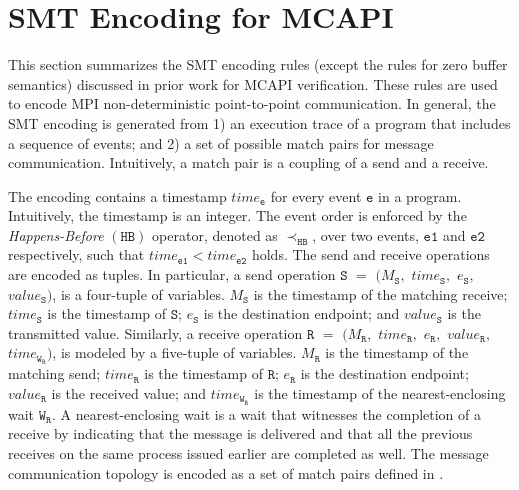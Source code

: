 \section{SMT Encoding for MCAPI}
This section summarizes the SMT encoding rules (except the rules for zero buffer semantics) discussed in prior work for MCAPI verification. These rules are used to encode MPI non-deterministic point-to-point communication. In general, the SMT encoding is generated from 1) an execution trace of a program that includes a sequence of events; and 2) a set of possible match pairs for message communication. Intuitively, a match pair is a coupling of a send and a receive. 


The encoding contains a timestamp $\mathit{time}_\mathtt{e}$ for every event $\mathtt{e}$ in a program. Intuitively, the timestamp is an integer.  The event order is enforced by the \emph{Happens-Before} $(\mathtt{HB})$ operator, denoted as
$\mathrm{\prec_\mathtt{HB}}$, over two events, $\mathtt{e1}$ and $\mathtt{e2}$ respectively, such that $\mathit{time}_\mathtt{e1} <  \mathit{time}_\mathtt{e2}$ holds. The send and receive operations are encoded as tuples. In particular, a send operation $\mathtt{S}$ $=$ $(M_\mathtt{S},$ $\mathit{time}_\mathtt{S},$ $e_\mathtt{S},$ $\mathit{value}_\mathtt{S})$, is a four-tuple of variables. $M_\mathtt{S}$ is the timestamp of the matching receive; $\mathit{time}_\mathtt{S}$ is the timestamp of $\mathtt{S}$; $e_\mathtt{S}$ is the destination endpoint; and $\mathit{value}_\mathtt{S}$ is the transmitted value. Similarly, a receive operation $\mathtt{R}$ $=$ $(M_\mathtt{R},$ $\mathit{time}_\mathtt{R},$ $e_\mathtt{R},$ $\mathit{value}_\mathtt{R},$ $\mathit{time}_{\mathtt{W}_\mathtt{R}})$, is modeled by a five-tuple of variables. $M_\mathtt{R}$ is the timestamp of the matching send; $\mathit{time}_\mathtt{R}$ is the timestamp of $\mathtt{R}$; $e_\mathtt{R}$ is the destination endpoint; $\mathit{value}_\mathtt{R}$ is the received value; and $\mathit{time}_{\mathtt{W}_\mathtt{R}}$ is the timestamp of the nearest-enclosing wait ${\mathtt{W}_\mathtt{R}}$. A nearest-enclosing wait is a wait that witnesses the completion of a receive by indicating that the message is delivered and that all the previous receives on the same process issued earlier are completed as well. The message communication topology is encoded as a set of match pairs defined in .

